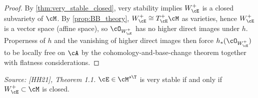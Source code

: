 \begin{proof}
  By \cref{thm:very_stable_closed}, very stability implies \(W^+_{\cE}\) is a closed subvariety
  of \(\cM\).  By \cref{prop:BB_theory}, \(W^+_{\cE} \cong T^+_{\cE}\cM\) as varieties, hence
  \(W^+_{\cE}\) is a vector space (affine space), so \(\cO_{W^+_{\cE}}\) has no higher direct
  images under \(h\).  Properness of \(h\) and the vanishing of higher direct images then
  force \(h_*(\cO_{W^+_{\cE}})\) to be locally free on \(\cA\) by the cohomology-and-base-change
  theorem together with flatness considerations.
\end{proof}

\begin{theorem}
  \label{thm:very_stable_closed}
  \textit{Source: [HH21], Theorem 1.1.}
  \(\cE \in \cM^{s\T}\) is very stable if and only if \(W^+_{\cE} \subset \cM\) is closed.
\end{theorem}

